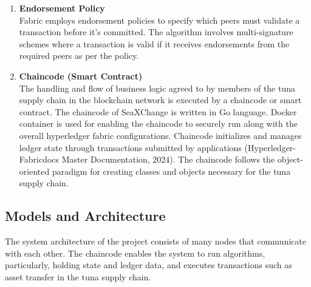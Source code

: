 \begin{enumerate}
		\item \textbf{Endorsement Policy} \\Fabric employs endorsement policies to specify which peers must validate a transaction before it's committed. The algorithm involves multi-signature schemes where a transaction is valid if it receives endorsements from the required peers as per the policy.
		
		\item \textbf{Chaincode (Smart Contract)} \\The handling and flow of business logic agreed to by members of the tuna supply chain in the blockchain network is executed by a chaincode or smart contract. The chaincode of SeaXChange is written in Go language. Docker container is used for enabling the chaincode to securely run along with the overall hyperledger fabric configurations. Chaincode initializes and manages ledger state through transactions submitted by applications (Hyperledger-Fabricdocs Master Documentation, 2024). The chaincode follows the object-oriented paradigm for creating classes and objects necessary for the tuna supply chain.
		
		
	\end{enumerate}

\subsection{Models and Architecture}
The system architecture of the project consists of many nodes that communicate with each other. The chaincode enables the system to run algorithms, particularly, holding state and ledger data, and executes transactions such as asset transfer in the tuna supply chain. 

